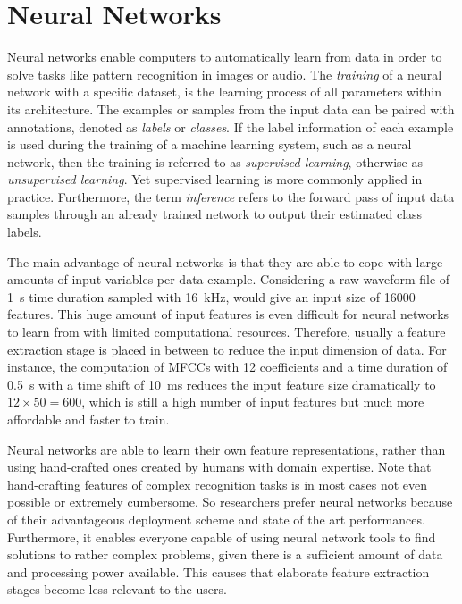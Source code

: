 
\section{Neural Networks}\label{sec:intro_nn}
Neural networks enable computers to automatically learn from data in order to solve tasks like pattern recognition in images or audio.
The \emph{training} of a neural network with a specific dataset, is the learning process of all parameters within its architecture.
The examples or samples from the input data can be paired with annotations, denoted as \emph{labels} or \emph{classes}.
If the label information of each example is used during the training of a machine learning system, such as a neural network, then the training is referred to as \emph{supervised learning}, otherwise as \emph{unsupervised learning}.
Yet supervised learning is more commonly applied in practice.
Furthermore, the term \emph{inference} refers to the forward pass of input data samples through an already trained network to output their estimated class labels.

The main advantage of neural networks is that they are able to cope with large amounts of input variables per data example.
Considering a raw waveform file of \SI{1}{s} time duration sampled with \SI{16}{\kilo\hertz}, would give an input size of 16000 features.
This huge amount of input features is even difficult for neural networks to learn from with limited computational resources.
Therefore, usually a feature extraction stage is placed in between to reduce the input dimension of data.
For instance, the computation of MFCCs with 12 coefficients and a time duration of \SI{0.5}{s} with a time shift of \SI{10}{\milli\second} reduces the input feature size dramatically to $12 \times 50 = 600$, which is still a high number of input features but much more affordable and faster to train.

Neural networks are able to learn their own feature representations, rather than using hand-crafted ones created by humans with domain expertise.
Note that hand-crafting features of complex recognition tasks is in most cases not even possible or extremely cumbersome.
So researchers prefer neural networks because of their advantageous deployment scheme and state of the art performances.
Furthermore, it enables everyone capable of using neural network tools to find solutions to rather complex problems, given there is a sufficient amount of data and processing power available.
This causes that elaborate feature extraction stages become less relevant to the users.

